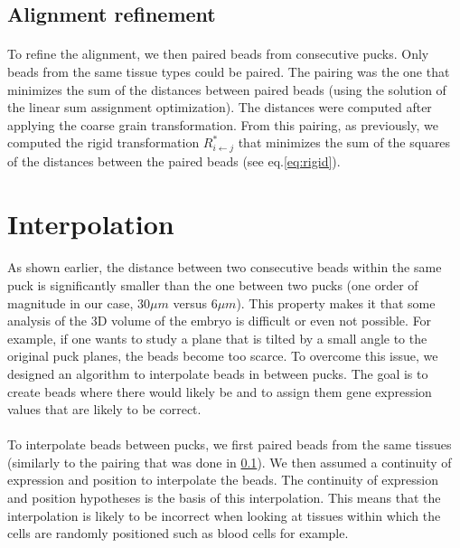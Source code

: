 \documentclass[10pt,a4paper]{article}
\begin{document}
\subsection{Alignment refinement}\label{subsec:ali-ref}
\paragraph{}To refine the alignment, we then paired beads from consecutive pucks.
Only beads from the same tissue types could be paired.
The pairing was the one that minimizes the sum of the distances between paired beads (using the solution of the linear sum assignment optimization).
The distances were computed after applying the coarse grain transformation.
From this pairing, as previously, we computed the rigid transformation \(R^*_{i\leftarrow j}\) that minimizes the sum of the squares of the distances between the paired beads (see eq.\eqref{eq:rigid}).
\section{Interpolation}
\paragraph{}As shown earlier, the distance between two consecutive beads within the same puck is significantly smaller than the one between two pucks (one order of magnitude in our case, \(30\mu m\) versus \(6\mu m\)). This property makes it that some analysis of the 3D volume of the embryo is difficult or even not possible. For example, if one wants to study a plane that is tilted by a small angle to the original puck planes, the beads become too scarce. To overcome this issue, we designed an algorithm to interpolate beads in between pucks. The goal is to create beads where there would likely be and to assign them gene expression values that are likely to be correct.
\paragraph{}To interpolate beads between pucks, we first paired beads from the same tissues (similarly to the pairing that was done in \ref{subsec:ali-ref}).
We then assumed a continuity of expression and position to interpolate the beads.
The continuity of expression and position hypotheses is the basis of this interpolation.
This means that the interpolation is likely to be incorrect when looking at tissues within which the cells are randomly positioned such as blood cells for example.
\end{document}
